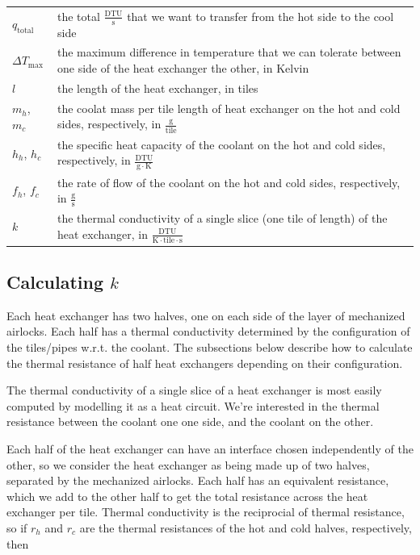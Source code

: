 \documentclass{article}
\numberwithin{equation}{subsection}
\theoremstyle{remark}
\newcommand{\qtotal}{q_{\mathrm{total}}}
\newcommand{\DeltaT}{\Delta{}T}
\newcommand{\DeltaTmax}{\DeltaT_{\mathrm{max}}}
\newenvironment{definitiontable}{
\renewcommand{\arraystretch}{1.5}
\begin{tabular}{lp{0.8\textwidth}}
}
{
\end{tabular}
\renewcommand{\arraystretch}{1.0}
}
\begin{document}
\begin{definitiontable}
\(\qtotal\) & the total \(\frac{\mathrm{DTU}}{\mathrm{s}}\) that we want to transfer from the hot side to the cool side \\

\(\DeltaTmax\) & the maximum difference in temperature that we can tolerate between one side of the heat exchanger the other, in Kelvin \\

\(l\) & the length of the heat exchanger, in tiles \\

\(m_{h}\), \(m_{c}\) & the coolat mass per tile length of heat exchanger on the hot and cold sides, respectively, in \(\frac{\mathrm{g}}{\mathrm{tile}}\) \\

\(h_{h}\), \(h_{c}\) & the specific heat capacity of the coolant on the hot and cold sides, respectively, in \(\frac{\mathrm{DTU}}{\mathrm{g} \cdot \mathrm{K}}\) \\

\(f_{h}\), \(f_{c}\) & the rate of flow of the coolant on the hot and cold sides, respectively, in \(\frac{\mathrm{g}}{\mathrm{s}}\) \\

\(k\) & the thermal conductivity of a single slice (one tile of length) of the heat exchanger, in \(\frac{\mathrm{DTU}}{\mathrm{K} \cdot \mathrm{tile} \cdot \mathrm{s}}\) \\
\end{definitiontable}

\subsection{Calculating \(k\)}

Each heat exchanger has two halves, one on each side of the layer of mechanized airlocks.
Each half has a thermal conductivity determined by the configuration of the tiles/pipes w.r.t. the coolant.
The subsections below describe how to calculate the thermal resistance of half heat exchangers depending on their configuration.

The thermal conductivity of a single slice of a heat exchanger is most easily computed by modelling it as a heat circuit.
We're interested in the thermal resistance between the coolant one one side, and the coolant on the other.

Each half of the heat exchanger can have an interface chosen independently of the other, so we consider the heat exchanger as being made up of two halves, separated by the mechanized airlocks.
Each half has an equivalent resistance, which we add to the other half to get the total resistance across the heat exchanger per tile.
Thermal conductivity is the reciprocial of thermal resistance, so if \(r_{h}\) and \(r_{c}\) are the thermal resistances of the hot and cold halves, respectively, then
\end{document}
